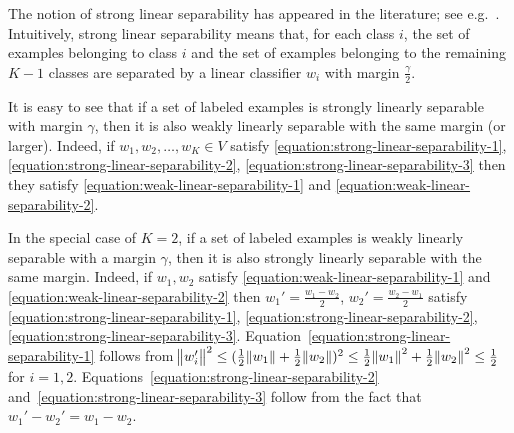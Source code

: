 
The notion of strong linear separability has appeared in the literature; see
e.g.~\citep{Chen-Chen-Zhang-Chen-Zhang-2009}. Intuitively, strong linear
separability means that, for each class $i$, the set of examples belonging to
class $i$ and the set of examples belonging to the remaining $K-1$ classes are
separated by a linear classifier $w_i$ with margin $\frac{\gamma}{2}$.

It is easy to see that if a set of labeled examples is strongly linearly
separable with margin $\gamma$, then it is also weakly linearly separable with
the same margin (or larger). Indeed, if $w_1, w_2, \dots, w_K \in V$ satisfy
\eqref{equation:strong-linear-separability-1},
\eqref{equation:strong-linear-separability-2},
\eqref{equation:strong-linear-separability-3} then they satisfy
\eqref{equation:weak-linear-separability-1} and
\eqref{equation:weak-linear-separability-2}.

In the special case of $K=2$, if a set of labeled examples is weakly
linearly separable with a margin $\gamma$, then it is also strongly linearly
separable with the same margin. Indeed, if $w_1, w_2$ satisfy
\eqref{equation:weak-linear-separability-1} and
\eqref{equation:weak-linear-separability-2} then $w_1' = \frac{w_1 - w_2}{2}$,
$w_2' = \frac{w_2 - w_1}{2}$ satisfy
\eqref{equation:strong-linear-separability-1},
\eqref{equation:strong-linear-separability-2},
\eqref{equation:strong-linear-separability-3}.
Equation~\eqref{equation:strong-linear-separability-1} follows from
$\norm{w_i'}^2 \le (\frac{1}{2} \norm{w_1} + \frac{1}{2} \norm{w_2})^2 \le
\frac{1}{2}\norm{w_1}^2 + \frac{1}{2}\norm{w_2}^2 \le \frac{1}{2}$ for $i=1,2$.
Equations~\eqref{equation:strong-linear-separability-2}
and~\eqref{equation:strong-linear-separability-3} follow from the fact that
$w_1' - w_2' = w_1 - w_2$.


